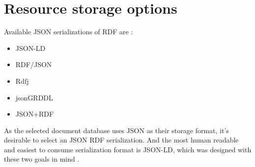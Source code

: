 

\section{Resource storage options}
Available JSON serializations of RDF are \cite{onlineW3CRdfSyntax}:
\begin{itemize}
	\item JSON-LD
	\item RDF/JSON
	\item Rdfj
	\item jsonGRDDL
	\item JSON+RDF
\end{itemize}
As the selected document database uses JSON as their storage format, it's desirable to select an JSON RDF serialization. And the most human readable and easiest to consume serialization format is JSON-LD, which was designed with these two goals in mind \cite{onlineJsonLdDesignGoals}. 

